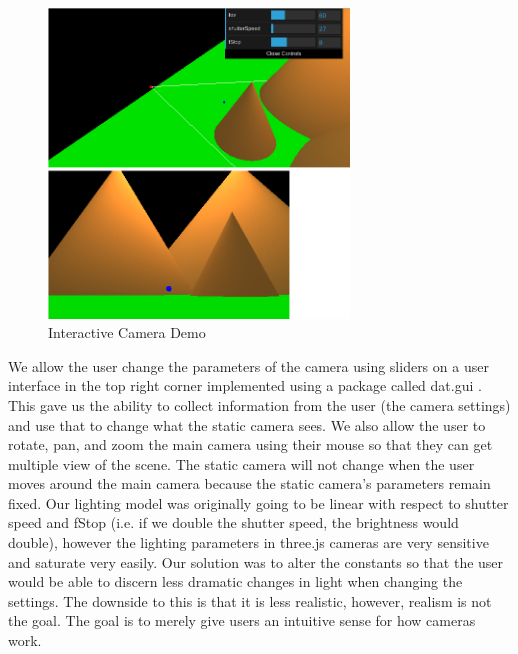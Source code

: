 \documentclass{acm_proc_article-sp}
\begin{document}
\begin{figure}[h]
\caption{Interactive Camera Demo }
\includegraphics[width=8cm]{images/demo.png}
\end{figure}

We allow the user change the parameters of the camera using sliders on a user
interface in the top right corner implemented using a package called dat.gui
\cite{datgui}. This gave us the ability to collect information from the user
(the camera settings) and use that to change what the static camera sees. We
also allow the user to rotate, pan, and zoom the main camera using their mouse
so that they can get multiple view of the scene. The static camera will not
change when the user moves around the main camera because the static camera's
parameters remain fixed. Our lighting model was originally going to be linear
with respect to shutter speed and fStop (i.e. if we double the shutter speed,
the brightness would double), however the lighting parameters in three.js
cameras are very sensitive and saturate very easily. Our solution was to alter
the constants so that the user would be able to discern less dramatic changes
in light when changing the settings. The downside to this is that it is less
realistic, however, realism is not the goal. The goal is to merely give users
an intuitive sense for how cameras work.
\end{document}

